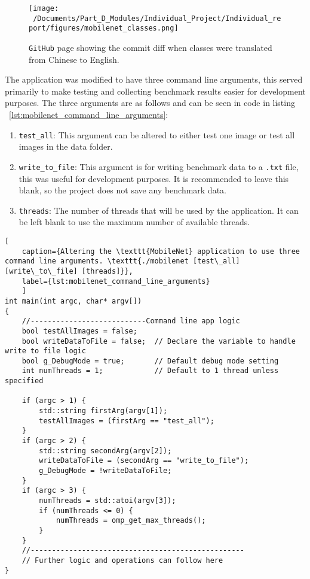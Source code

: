 \begin{figure}[H] %
	\centering
	\texttt{[image: ~/Documents/Part\_D\_Modules/Individual\_Project/Individual\_report/figures/mobilenet\_classes.png]} %
	\caption{\texttt{GitHub} page showing the commit diff when classes were translated from Chinese to English. }
	\label{fig:mobilenet_classes} %
\end{figure}

The application was modified to have three command line arguments, this served primarily to make testing and collecting benchmark results easier for development purposes. The three arguments are as follows and can be seen in code in listing ~\ref{lst:mobilenet_command_line_arguments}:

\begin{enumerate}
	\item \texttt{test\_all}: This argument can be altered to either test one image or test all images in the data folder.  
	\item \texttt{write\_to\_file}: This argument is for writing benchmark data to a \texttt{.txt} file, this was useful for development purposes. It is recommended to leave this blank, so the project does not save any benchmark data. 
	\item \texttt{threads}: The number of threads that will be used by the application. It can be left blank to use the maximum number of available threads.  
\end{enumerate}

\begin{lstlisting}[
	caption={Altering the \texttt{MobileNet} application to use three command line arguments. \texttt{./mobilenet [test\_all] [write\_to\_file] [threads]}},
	label={lst:mobilenet_command_line_arguments}
	]
int main(int argc, char* argv[])
{
	//---------------------------Command line app logic
	bool testAllImages = false;
	bool writeDataToFile = false;  // Declare the variable to handle write to file logic
	bool g_DebugMode = true;       // Default debug mode setting
	int numThreads = 1;            // Default to 1 thread unless specified
	
	if (argc > 1) {
		std::string firstArg(argv[1]);
		testAllImages = (firstArg == "test_all");
	}
	if (argc > 2) {
		std::string secondArg(argv[2]);
		writeDataToFile = (secondArg == "write_to_file");
		g_DebugMode = !writeDataToFile; 
	}
	if (argc > 3) {
		numThreads = std::atoi(argv[3]);
		if (numThreads <= 0) {
			numThreads = omp_get_max_threads();  
		}
	}
	//--------------------------------------------------
	// Further logic and operations can follow here
}
\end{lstlisting}


